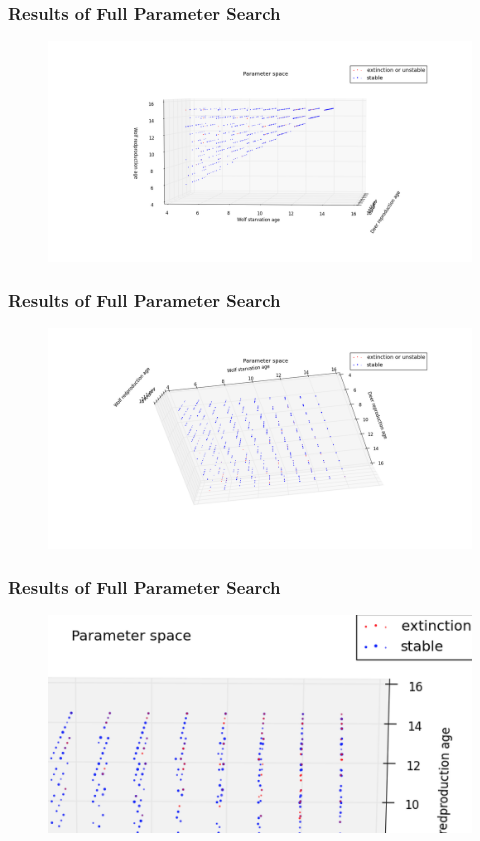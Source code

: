 \documentclass{beamer}
\begin{document}
\frame
{
  \frametitle{Results of Full Parameter Search}
  \begin{figure}[H]
	\includegraphics[width = 1\textwidth]{./pics/Eco_All_param_wage_v_wstarve.png}
  \end{figure}
}
                
\frame
{
  \frametitle{Results of Full Parameter Search}
  \begin{figure}[H]
	\includegraphics[width = 1\textwidth]{./pics/Eco_All_param_wstarve_v_drep.png}
  \end{figure}

}


\frame
{
  \frametitle{Results of Full Parameter Search}
  \begin{figure}[H]
        \includegraphics[width = 1\textwidth]{./pics/Zoomedin_3D.png}
  \end{figure}
}
\end{document}
